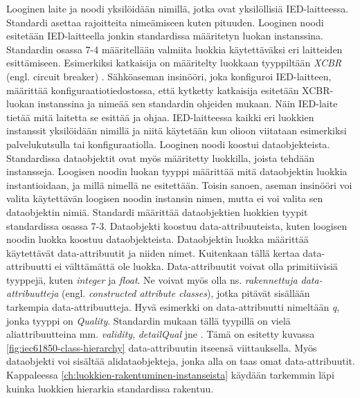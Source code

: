 Looginen laite ja noodi yksilöidään nimillä, jotka ovat yksilöllisiä IED-laitteessa. Standardi asettaa rajoitteita nimeämiseen kuten pituuden. Looginen noodi esitetään IED-laitteella jonkin standardissa määritetyn luokan instanssina. Standardin osassa 7-4 määritellään valmiita luokkia käytettäväksi eri laitteiden esittämiseen. Esimerkiksi katkaisija on määritelty luokkaan tyyppiltään \emph{XCBR} (engl. circuit breaker) \mbox{\cite[s.~105--106]{IEC61850-7-4}}. Sähköaseman insinööri, joka konfiguroi IED-laitteen, määrittää konfiguraatiotiedostossa, että kytketty katkaisija esitetään XCBR-luokan instanssina ja nimeää sen standardin ohjeiden mukaan. Näin IED-laite tietää mitä laitetta se esittää ja ohjaa. IED-laitteessa kaikki eri luokkien instanssit yksilöidään nimillä ja niitä käytetään kun olioon viitataan esimerkiksi palvelukutsulla tai konfiguraatiolla. Looginen noodi koostui dataobjekteista. Standardissa dataobjektit ovat myös määritetty luokkilla, joista tehdään instansseja. Loogisen noodin luokan tyyppi määrittää mitä dataobjektin luokkia instantioidaan, ja millä nimellä ne esitettään. Toisin sanoen, aseman insinööri voi valita käytettävän loogisen noodin instansin nimen, mutta ei voi valita sen dataobjektin nimiä. Standardi määrittää dataobjektien luokkien tyypit standardissa osassa 7-3. Dataobjekti koostuu data-attribuuteista, kuten loogisen noodin luokka koostuu dataobjekteista. Dataobjektin luokka määrittää käytettävät data-attribuutit ja niiden nimet. Kuitenkaan tällä kertaa data-attribuutti ei välttämättä ole luokka. Data-attribuutit voivat olla primitiivisiä tyyppejä, kuten \emph{integer} ja \emph{float}. Ne voivat myös olla ns. \emph{rakennettuja data-attribuutteja} (engl. \emph{constructed attribute classes}), jotka pitävät sisällään tarkempia data-attribuutteja. Hyvä esimerkki on data-attribuutti nimeltään \emph{q}, jonka tyyppi on \emph{Quality}. Standardin mukaan tällä tyypillä on vielä aliattribuutteina mm. \emph{validity}, \emph{detailQual} jne \mbox{\cite[s.~11]{IEC61850-7-3}}. Tämä on esitetty kuvassa \ref{fig:iec61850-class-hierarchy} data-attribuutin itseensä viittauksella. Myös dataobjekti voi sisältää alidataobjekteja, jonka alla on taas omat data-attribuutit. Kappaleessa \ref{ch:luokkien-rakentuminen-instanseista} käydään tarkemmin läpi kuinka luokkien hierarkia standardissa rakentuu. \mbox{\cite{IEC61850-1, IEC61850-7-1, IEC61850-7-2, IEC61850-7-3}}


